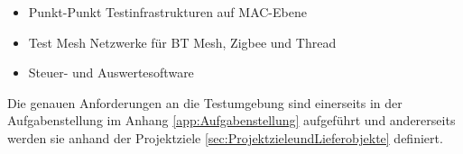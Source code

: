\begin{itemize}
 	\item Punkt-Punkt Testinfrastrukturen auf MAC-Ebene
 	\item Test Mesh Netzwerke für BT Mesh, Zigbee und Thread
 	\item Steuer- und Auswertesoftware
\end{itemize}

Die genauen Anforderungen an die Testumgebung sind einerseits in der Aufgabenstellung im Anhang \ref{app:Aufgabenstellung} aufgeführt und andererseits werden sie anhand der Projektziele \ref{sec:ProjektzieleundLieferobjekte} definiert.








